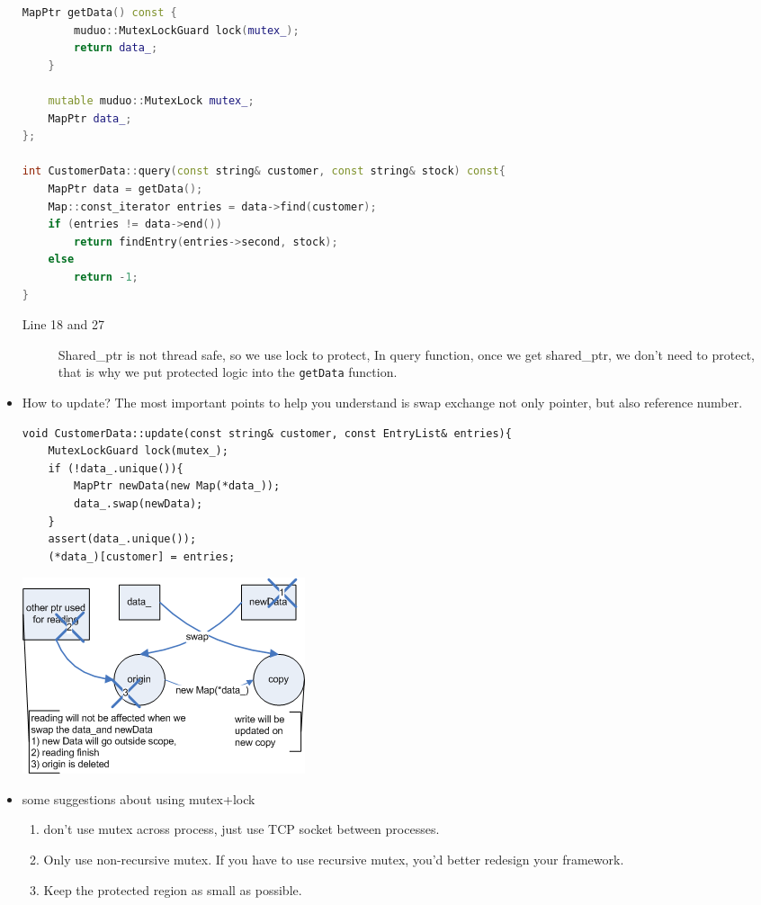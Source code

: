 \documentclass[a4paper,11pt,twoside]{book}
\begin{document}
\begin{itemize}
\begin{lstlisting}[frame=single, language=c++]
	MapPtr getData() const { 
		muduo::MutexLockGuard lock(mutex_);
		return data_;
	}
	
	mutable muduo::MutexLock mutex_;
	MapPtr data_;
};

int CustomerData::query(const string& customer, const string& stock) const{
	MapPtr data = getData();
	Map::const_iterator entries = data->find(customer);
	if (entries != data->end())
		return findEntry(entries->second, stock);
	else
		return -1;
}
\end{lstlisting}
\begin{description}
	\item[Line 18 and 27] Shared\_ptr is not thread safe, so we use lock to protect, In query function, once we get shared\_ptr, we don't need to protect, that is why we put protected logic into the \texttt{getData} function.
\end{description}

	\item How to update? The most important points to help you understand is swap exchange not only pointer, but also reference number. 
\begin{lstlisting}
void CustomerData::update(const string& customer, const EntryList& entries){
    MutexLockGuard lock(mutex_);
	if (!data_.unique()){
	    MapPtr newData(new Map(*data_));
		data_.swap(newData);
    }
	assert(data_.unique());
	(*data_)[customer] = entries;
\end{lstlisting}

\begin{center}
		\includegraphics[width=0.65\linewidth]{pics/read_copy.png}
\end{center}


    \item some suggestions about using mutex+lock
\begin{enumerate}
    \item don't use mutex across process, just use TCP socket between processes. 

    \item Only use non-recursive mutex. If you have to use recursive mutex, you'd better redesign your framework.
    
    \item Keep the protected region as small as possible.

\end{enumerate}

\end{itemize}
\end{document}
